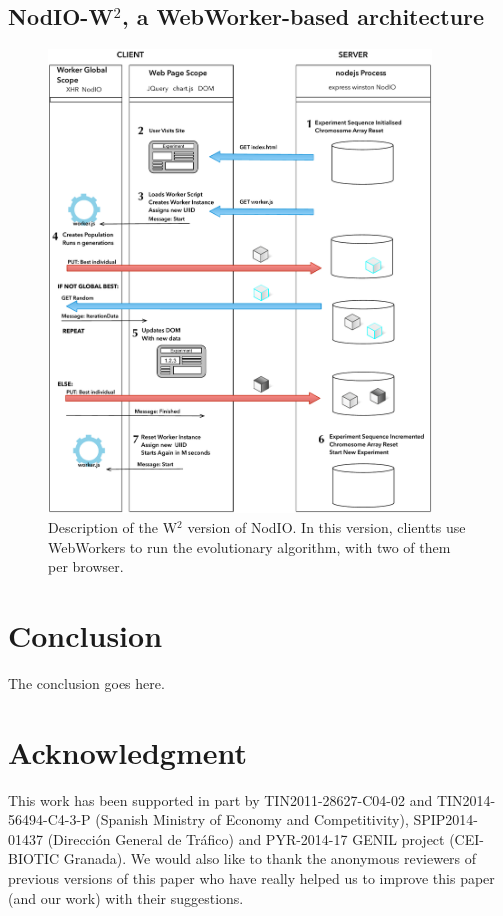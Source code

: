 \documentclass[journal,onecolumn]{IEEEtran}
\begin{document}
\subsection{{\sf NodIO-W$^2$}, a WebWorker-based architecture}

\begin{figure}[!t]
\centering
\includegraphics[width=4in]{img/Algorithm.pdf}
\caption{Description of the W$^2$ version of {\sf NodIO}. In this
  version, clientts use WebWorkers to run the evolutionary algorithm,
  with two of them per browser.}  
\label{fig:system:w2}
\end{figure}

\section{Conclusion}
\label{sec:conclusion}

The conclusion goes here.


\section*{Acknowledgment}

This work has been supported in part by TIN2011-28627-C04-02 and
TIN2014-56494-C4-3-P (Spanish Ministry of Economy and Competitivity),
SPIP2014-01437 (Direcci{\'o}n General de Tr{\'a}fico) and PYR-2014-17
GENIL project (CEI-BIOTIC Granada). We would also like to thank the
anonymous reviewers of previous versions of this paper who have really helped us to improve
this paper (and our work) with their suggestions.




\end{document}
